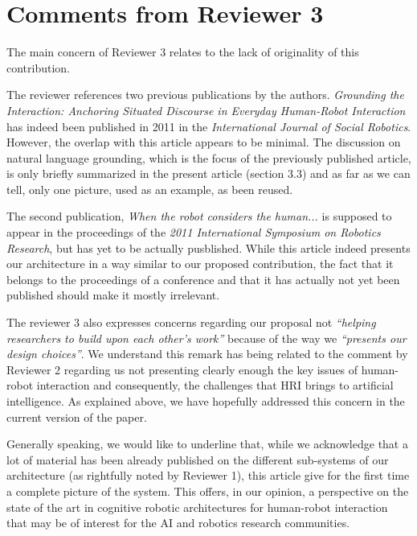 \documentclass{article}
\begin{document}
\section{Comments from Reviewer 3}

The main concern of Reviewer 3 relates to the lack of originality of this
contribution.

The reviewer references two previous publications by the authors. \emph{Grounding
the Interaction: Anchoring Situated Discourse in Everyday Human-Robot
Interaction} has indeed been published in 2011 in the \emph{International Journal of
Social Robotics}. However, the overlap with this article appears to be minimal. The
discussion on natural language grounding, which is the focus of the previously
published article, is only briefly summarized in the present article (section
3.3) and as far as we can tell, only one picture, used as an example, as been
reused.

The second publication, \emph{When the robot considers the human...} is supposed
to appear in the proceedings of the \emph{2011 International Symposium on
Robotics Research}, but has yet to be actually pusblished.  While this article
indeed presents our architecture in a way similar to our proposed contribution,
the fact that it belongs to the proceedings of a conference and that it has
actually not yet been published should make it mostly irrelevant.

The reviewer 3 also expresses concerns regarding our proposal not \emph{``helping
researchers to build upon each other's work''} because of the way we
\emph{``presents our design choices''}. We understand this remark has being
related to the comment by Reviewer 2 regarding us not presenting clearly
enough the key issues of human-robot interaction and consequently, the
challenges that HRI brings to artificial intelligence. As explained above, we
have hopefully addressed this concern in the current version of the paper.

Generally speaking, we would like to underline that, while we acknowledge that a
lot of material has been already published on the different sub-systems of
our architecture (as rightfully noted by Reviewer 1), this article give for the
first time a complete picture of the system. This offers, in our opinion, a
perspective on the state of the art in cognitive robotic architectures
for human-robot interaction that may be of interest for the AI and robotics
research communities.
\end{document}
